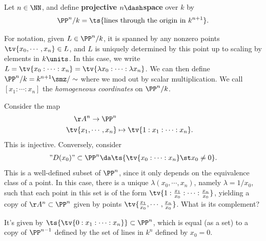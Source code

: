 \begin{definition}

Let \(n\in \NN\), and define \textbf{projective \(n\dash\)space} over
\(k\) by\\
\begin{align*}  
\PP^n/k = \ts{\text{lines through the origin in } k^{n+1}}
.\end{align*}

\end{definition}

\begin{remark}

For notation, given \(L\in \PP^n/k\), it is spanned by any nonzero
points \(\tv{x_0, \cdots, x_n} \in L\), and \(L\) is uniquely determined
by this point up to scaling by elements in \(k\units\). In this case, we
write
\(L = \tv{x_0: \cdots : x_n} = \tv{\lambda x_0: \cdots : \lambda x_n}\).
We can then define \(\PP^n/k = k^{n+1}\smz / \sim\) where we mod out by
scalar multiplication. We call \([x_1 : \cdots : x_n]\) the
\emph{homogeneous coordinates} on \(\PP^n/k\).

\end{remark}

\begin{remark}

Consider the map
\begin{align*}  
\AA^n \to \PP^n \\
\tv{x_1, \cdots, x_n} &\mapsto \tv{1: x_1 : \cdots : x_n}
.\end{align*} This is injective. Conversely, consider
\begin{align*}  
"D(x_0)" \subset \PP^n \da \ts{\tv{x_0 : \cdots : x_n} \st x_0\neq 0}
.\end{align*} This is a well-defined subset of \(\PP^n\), since it only
depends on the equivalence class of a point. In this case, there is a
unique \(\lambda(x_0, \cdots, x_n)\), namely \(\lambda = 1/x_0\), such
that each point in this set is of the form
\(\tv{1: {x_1\over x_0} : \cdots : {x_n \over x_0}}\), yielding a copy
of \(\AA^n\subset \PP^n\) given by points
\(\tv{{x_1\over x_0}, \cdots, {x_n\over x_0}}\). What is its complement?

It's given by \(\ts{\tv{0: x_1: \cdots : x_n}} \subset \PP^n\), which is
equal (as a set) to a copy of \(\PP^{n-1}\) defined by the set of lines
in \(k^n\) defined by \(x_0 = 0\).

\end{remark}

